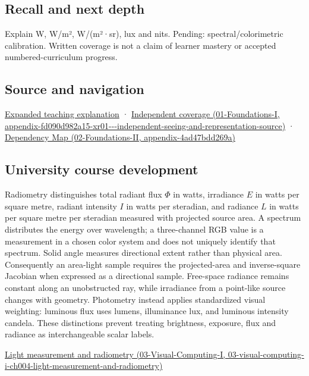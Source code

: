 \subsection{Recall and next depth}\label{appendix-215c2570199b-recall-and-next-depth}

Explain W, W/m², W/(m²·sr), lux and nits. Pending: spectral/colorimetric calibration. Written coverage is not a claim of learner mastery or accepted numbered-curriculum progress.

\subsection{Source and navigation}\label{appendix-215c2570199b-source-and-navigation}

\hyperref[04-visual-computing-ii-ch042-light-must-become-a-quantity-before-it-becomes-a-color]{Expanded teaching explanation} · \href{../01-Foundations-I/main.pdf\#nameddest=appendix-fd090d982a15-xr01---independent-seeing-and-representation-source}{Independent coverage (01-Foundations-I, appendix-fd090d982a15-xr01-\/-\/-independent-seeing-and-representation-source)} · \href{../02-Foundations-II/main.pdf\#nameddest=appendix-4ad47bdd269a}{Dependency Map (02-Foundations-II, appendix-4ad47bdd269a)}

\subsection{University course development}\label{appendix-215c2570199b-university-course-development}

Radiometry distinguishes total radiant flux \(\Phi\) in watts, irradiance \(E\) in watts per square metre, radiant intensity \(I\) in watts per steradian, and radiance \(L\) in watts per square metre per steradian measured with projected source area. A spectrum distributes the energy over wavelength; a three-channel RGB value is a measurement in a chosen color system and does not uniquely identify that spectrum. Solid angle measures directional extent rather than physical area. Consequently an area-light sample requires the projected-area and inverse-square Jacobian when expressed as a directional sample. Free-space radiance remains constant along an unobstructed ray, while irradiance from a point-like source changes with geometry. Photometry instead applies standardized visual weighting: luminous flux uses lumens, illuminance lux, and luminous intensity candela. These distinctions prevent treating brightness, exposure, flux and radiance as interchangeable scalar labels.

\href{../03-Visual-Computing-I/main.pdf\#nameddest=03-visual-computing-i-ch004-light-measurement-and-radiometry}{Light measurement and radiometry (03-Visual-Computing-I, 03-visual-computing-i-ch004-light-measurement-and-radiometry)}
